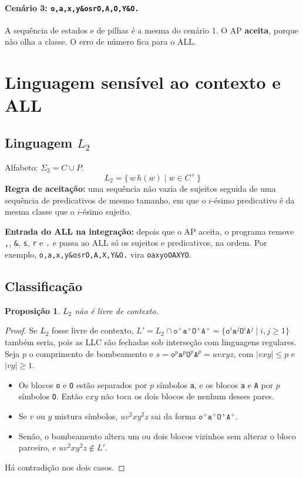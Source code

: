 \documentclass[11pt,a4paper]{article}
\newcommand{\cad}[1]{\texttt{#1}}       %
\newcommand{\Ldois}{L_2}
\newtheorem*{prop}{Proposição}
\begin{document}
\paragraph{Cenário 3: \cad{o,a,x,y\&osrO,A,O,Y\&O.}} A sequência de estados e de pilhas é a mesma do cenário 1. O AP \textbf{aceita}, porque não olha a classe. O erro de número fica para o ALL.

\section{Linguagem sensível ao contexto e ALL}

\subsection{Linguagem $\Ldois$}

Alfabeto: $\Sigma_2 = C\cup P$.
\[
\Ldois = \{\, w\,h(w) \mid w\in C^{+} \,\}
\]
\textbf{Regra de aceitação:} uma sequência não vazia de sujeitos seguida de uma sequência de predicativos de mesmo tamanho, em que o $i$-ésimo predicativo é da mesma classe que o $i$-ésimo sujeito.

\textbf{Entrada do ALL na integração:} depois que o AP aceita, o programa remove \cad{,}, \cad{\&}, \cad{s}, \cad{r} e \cad{.} e passa ao ALL só os sujeitos e predicativos, na ordem. Por exemplo, \cad{o,a,x,y\&osrO,A,X,Y\&O.} vira \cad{oaxyoOAXYO}.

\subsection{Classificação}

\begin{prop}
$\Ldois$ não é livre de contexto.
\end{prop}
\begin{proof}
Se $\Ldois$ fosse livre de contexto, $L'=\Ldois\cap\cad{o}^+\cad{a}^+\cad{O}^+\cad{A}^+=\{\cad{o}^i\cad{a}^j\cad{O}^i\cad{A}^j \mid i,j\ge1\}$ também seria, pois as LLC são fechadas sob interseção com linguagens regulares. Seja $p$ o comprimento de bombeamento e $s=\cad{o}^p\cad{a}^p\cad{O}^p\cad{A}^p=uvxyz$, com $|vxy|\le p$ e $|vy|\ge1$.
\begin{itemize}
  \item Os blocos \cad{o} e \cad{O} estão separados por $p$ símbolos \cad{a}, e os blocos \cad{a} e \cad{A} por $p$ símbolos \cad{O}. Então $vxy$ não toca os dois blocos de nenhum desses pares.
  \item Se $v$ ou $y$ mistura símbolos, $uv^2xy^2z$ sai da forma $\cad{o}^+\cad{a}^+\cad{O}^+\cad{A}^+$.
  \item Senão, o bombeamento altera um ou dois blocos vizinhos sem alterar o bloco parceiro, e $uv^2xy^2z\notin L'$.
\end{itemize}
Há contradição nos dois casos.
\end{proof}
\end{document}

